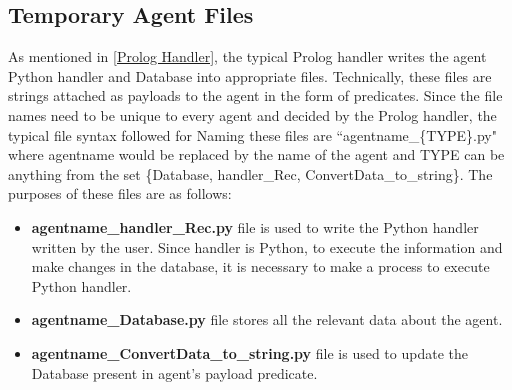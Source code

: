 \subsection{Temporary Agent Files}
As mentioned in \ref{Prolog Handler}, the typical Prolog handler writes the agent Python handler and Database into appropriate files. Technically, these files are strings attached as payloads to the agent in the form of predicates. Since the file names need to be unique to every agent and decided by the Prolog handler, the typical file syntax followed for Naming these files are ``agentname\_\{TYPE\}.py" where agentname would be replaced by the name of the agent and TYPE can be anything from the set \{Database, handler\_Rec, ConvertData\_to\_string\}. The purposes of these files are as follows:
\begin{itemize}
    \item \textbf{agentname\_handler\_Rec.py} file is used to write the Python handler written by the user. Since handler is Python, to execute the information and make changes in the database, it is necessary to make a process to execute Python handler.
    \item \textbf{agentname\_Database.py} file stores all the relevant data about the agent.
    \item \textbf{agentname\_ConvertData\_to\_string.py} file is used to update the Database present in agent's payload predicate.
\end{itemize}

